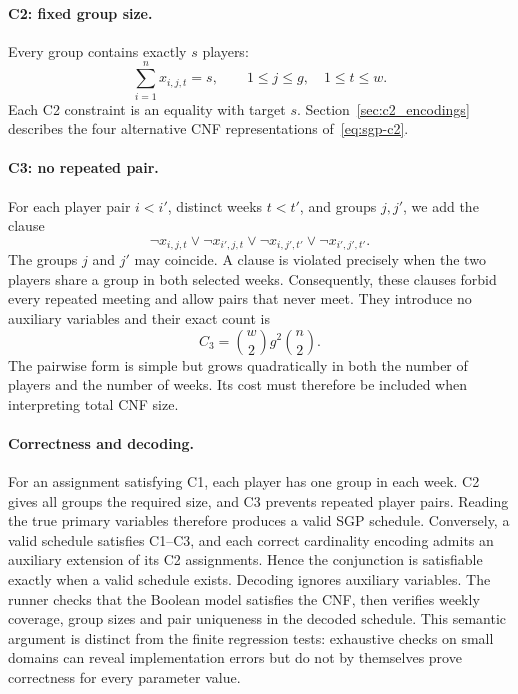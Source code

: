 \documentclass[a4paper,fleqn]{cas-sc}
\begin{document}
\paragraph{C2: fixed group size.}
Every group contains exactly $s$ players:
\begin{equation}
 \sum_{i=1}^{n}x_{i,j,t}=s,
 \qquad 1\leq j\leq g,\quad 1\leq t\leq w.
 \label{eq:sgp-c2}
\end{equation}
Each C2 constraint is an equality with target $s$. Section~\ref{sec:c2_encodings} describes the four
alternative CNF representations of~\eqref{eq:sgp-c2}.

\paragraph{C3: no repeated pair.}
For each player pair $i<i'$, distinct weeks $t<t'$, and groups $j,j'$, we
add the clause
\begin{equation}
 \neg x_{i,j,t}\lor\neg x_{i',j,t}\lor
 \neg x_{i,j',t'}\lor\neg x_{i',j',t'}.
 \label{eq:sgp-c3}
\end{equation}
The groups $j$ and $j'$ may coincide. A clause is violated precisely
when the two players share a group in both selected weeks. Consequently,
these clauses forbid every repeated meeting and allow pairs that never
meet. They introduce no auxiliary variables and their exact count is
\begin{equation}
 C_3=\binom{w}{2}g^2\binom{n}{2}.
 \label{eq:sgp-c3-size}
\end{equation}
The pairwise form is simple but grows quadratically in both the number
of players and the number of weeks. Its cost must therefore be included
when interpreting total CNF size.

\paragraph{Correctness and decoding.}
For an assignment satisfying C1, each player has one group in each week.
C2 gives all groups the required size, and C3 prevents repeated player
pairs. Reading the true primary variables therefore produces a valid
SGP schedule. Conversely, a valid schedule satisfies C1--C3, and each
correct cardinality encoding admits an auxiliary extension of its C2
assignments. Hence the conjunction is satisfiable exactly when a valid
schedule exists. Decoding ignores auxiliary variables. The runner checks that the Boolean model satisfies the CNF, then verifies
weekly coverage, group sizes and pair uniqueness in the decoded schedule.
This semantic argument is distinct from the finite regression tests:
exhaustive checks on small domains can reveal implementation errors but
do not by themselves prove correctness for every parameter value.
\end{document}
